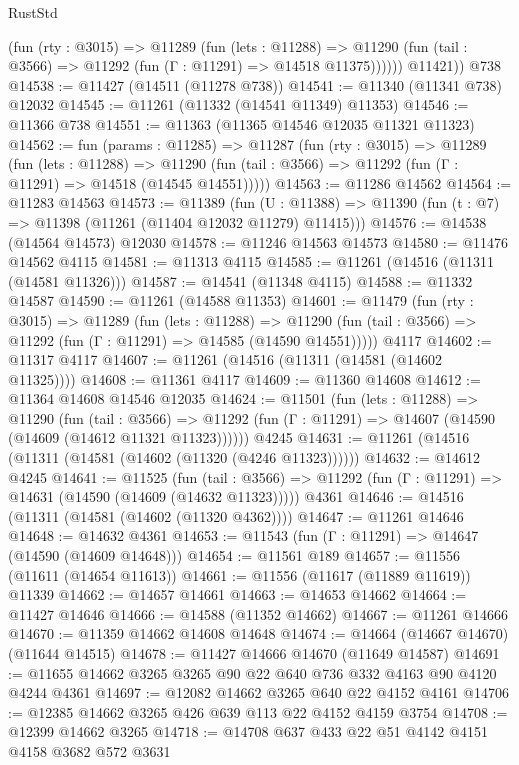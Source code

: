 \begin{lexlean}{RustStd}
\begin{coremodule}
            (fun (rty : @3015) =>
            @11289
              (fun (lets : @11288) =>
              @11290 (fun (tail : @3566) => @11292 (fun (Γ : @11291) => @14518 @11375))))))
        @11421))
    @738
@14538 := @11427 (@14511 (@11278 @738))
@14541 := @11340 (@11341 @738) @12032
@14545 := @11261 (@11332 (@14541 @11349) @11353)
@14546 := @11366 @738
@14551 := @11363 (@11365 @14546 @12035 @11321 @11323)
@14562 := fun (params : @11285) =>
  @11287
    (fun (rty : @3015) =>
    @11289
      (fun (lets : @11288) =>
      @11290 (fun (tail : @3566) => @11292 (fun (Γ : @11291) => @14518 (@14545 @14551)))))
@14563 := @11286 @14562
@14564 := @11283 @14563
@14573 := @11389
    (fun (U : @11388) => @11390 (fun (t : @7) => @11398 (@11261 (@11404 @12032 @11279) @11415)))
@14576 := @14538 (@14564 @14573) @12030
@14578 := @11246 @14563 @14573
@14580 := @11476 @14562 @4115
@14581 := @11313 @4115
@14585 := @11261 (@14516 (@11311 (@14581 @11326)))
@14587 := @14541 (@11348 @4115)
@14588 := @11332 @14587
@14590 := @11261 (@14588 @11353)
@14601 := @11479
    (fun (rty : @3015) =>
    @11289
      (fun (lets : @11288) =>
      @11290 (fun (tail : @3566) => @11292 (fun (Γ : @11291) => @14585 (@14590 @14551)))))
    @4117
@14602 := @11317 @4117
@14607 := @11261 (@14516 (@11311 (@14581 (@14602 @11325))))
@14608 := @11361 @4117
@14609 := @11360 @14608
@14612 := @11364 @14608 @14546 @12035
@14624 := @11501
    (fun (lets : @11288) =>
    @11290
      (fun (tail : @3566) =>
      @11292 (fun (Γ : @11291) => @14607 (@14590 (@14609 (@14612 @11321 @11323))))))
    @4245
@14631 := @11261 (@14516 (@11311 (@14581 (@14602 (@11320 (@4246 @11323))))))
@14632 := @14612 @4245
@14641 := @11525
    (fun (tail : @3566) => @11292 (fun (Γ : @11291) => @14631 (@14590 (@14609 (@14632 @11323)))))
    @4361
@14646 := @14516 (@11311 (@14581 (@14602 (@11320 @4362))))
@14647 := @11261 @14646
@14648 := @14632 @4361
@14653 := @11543 (fun (Γ : @11291) => @14647 (@14590 (@14609 @14648)))
@14654 := @11561 @189
@14657 := @11556 (@11611 (@14654 @11613))
@14661 := @11556 (@11617 (@11889 @11619)) @11339
@14662 := @14657 @14661
@14663 := @14653 @14662
@14664 := @11427 @14646
@14666 := @14588 (@11352 @14662)
@14667 := @11261 @14666
@14670 := @11359 @14662 @14608 @14648
@14674 := @14664 (@14667 @14670) (@11644 @14515)
@14678 := @11427 @14666 @14670 (@11649 @14587)
@14691 := @11655 @14662 @3265 @3265 @90 @22 @640 @736 @332 @4163 @90 @4120 @4244 @4361
@14697 := @12082 @14662 @3265 @640 @22 @4152 @4161
@14706 := @12385 @14662 @3265 @426 @639 @113 @22 @4152 @4159 @3754
@14708 := @12399 @14662 @3265
@14718 := @14708 @637 @433 @22 @51 @4142 @4151 @4158 @3682 @572 @3631

\end{coremodule}
\end{lexlean}

